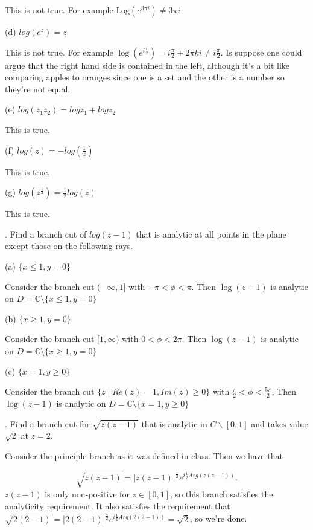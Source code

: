 \documentclass[letterpaper, reqno,11pt]{article}
\begin{document}
This is not true. For example $\text{Log}(e^{3\pi i})\neq 3\pi i$

(d) $ log (e^z)=z$

This is not true. For example $ \log\left( e^{i\frac{\pi}{2}} \right)=i\frac{\pi}{2}+2\pi ki \neq i\frac{\pi}{2}$. Is suppose one could argue that the right hand side is contained in the left, although it's a bit like comparing apples to oranges since one is a set and the other is a number so they're not equal. 

(e) $ log (z_1 z_2)=log z_1+ log z_2 $

This is true. 

(f) $ log (z)=- log (\frac{1}{z})$

This is true. 

(g) $ log (z^{\frac{1}{2}})=\frac{1}{2} log (z)$

This is true. 

\medskip


. Find a branch cut of $ log (z-1)$ that is analytic at all points in the plane except those on the following rays.

(a) $ \{ x\leq 1, y=0 \}$

Consider the branch cut $(-\infty, 1]$ with $-\pi<\phi<\pi$. Then $ \log(z-1)$ is analytic on $D=\mathbb{C}\setminus\{ x\leq 1, y=0 \}$

(b) $ \{ x \geq 1, y=0 \}$

Consider the branch cut $[1, \infty)$ with $0<\phi<2\pi$. Then $ \log(z-1)$ is analytic on $D=\mathbb{C}\setminus\{ x\geq 1, y=0 \}$

(c) $\{ x=1, y \geq 0 \}$

Consider the branch cut $\{z\mid Re(z)=1, Im(z)\geq 0\} $ with $\frac{\pi}{2}<\phi <\frac{5\pi}{2}$. Then $ \log(z-1)$ is analytic on $D=\mathbb{C}\setminus\{ x= 1, y\geq 0 \}$


\medskip




\medskip


. Find a branch cut for $\sqrt{z (z-1)}$ that is analytic in $ C \backslash [0, 1]$ and takes value $ \sqrt{2} $ at $z=2$.

Consider the principle branch as it was defined in class. Then we have that 

\[
\sqrt{z(z-1)} =|z(z-1)|^{\frac{1}{2}}e^{i \frac{1}{2}Arg(z(z-1))}
.\]
$z(z-1)$ is only non-positive for $z\in[0, 1]$, so this branch satisfies the analyticity requirement. It also satisfies the requirement that $\sqrt{2(2-1)} =|2(2-1)|^{\frac{1}{2}}e^{i \frac{1}{2}Arg(2(2-1))}=\sqrt{2} $, so we're done. 
\end{document}
